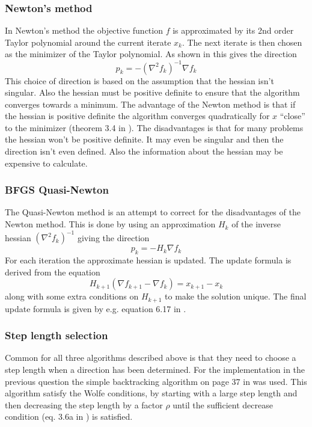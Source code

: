 \subsubsection*{Newton's method}
In Newton's method the objective function $f$ is approximated by its 2nd order Taylor polynomial around the current iterate $x_k$. The next iterate is then chosen as the minimizer of the Taylor polynomial. As shown in \cite[p.44]{nielsen10} this gives the direction
\begin{equation*}
    p_k = -(\nabla^2 f_k)^{-1}\nabla f_k
\end{equation*}
This choice of direction is based on the assumption that the hessian isn't singular. Also the hessian must be positive definite to ensure that the algorithm converges towards a minimum. The advantage of the Newton method is that if the hessian is positive definite the algorithm converges quadratically for $x$ ``close'' to the minimizer (theorem 3.4 in \cite{nielsen10}). The disadvantages is that for many problems the hessian won't be positive definite. It may even be singular and then the direction isn't even defined. Also the information about the hessian may be expensive to calculate.

\subsubsection*{BFGS Quasi-Newton}
The Quasi-Newton method is an attempt to correct for the disadvantages of the Newton method. This is done by using an approximation $H_k$ of the inverse hessian $(\nabla^2 f_k)^{-1}$ giving the direction
\begin{equation*}
    p_k = -H_k \nabla f_k
\end{equation*}
For each iteration the approximate hessian is updated. The update formula is derived from the equation
\begin{equation*}
    H_{k+1}(\nabla f_{k+1} - \nabla f_k) = x_{k+1} - x_k
\end{equation*}
along with some extra conditions on $H_{k+1}$ to make the solution unique. The final update formula is given by e.g. equation 6.17 in \cite{nocedal06}.

\subsubsection*{Step length selection}
Common for all three algorithms described above is that they need to choose a step length when a direction has been determined. For the implementation in the previous question the simple backtracking algorithm on page 37 in \cite{nocedal06} was used. This algorithm satisfy the Wolfe conditions, by starting with a large step length and then decreasing the step length by a factor $\rho$ until the sufficient decrease condition (eq. 3.6a in \cite{nocedal06}) is satisfied.

